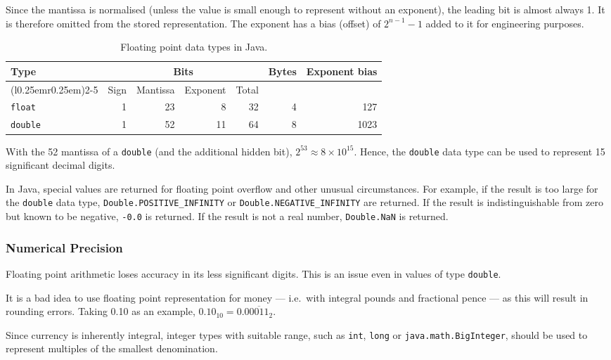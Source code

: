 Since the mantissa is normalised (unless the value is small enough to represent without an exponent), the leading bit is almost always \num{1}.
It is therefore omitted from the stored representation.
The exponent has a bias (offset) of \( 2^{n-1} - 1 \) added to it for engineering purposes.

\begin{table}[htp]
  \centering
  \caption*{Floating point data types in Java.}
  \begin{tabular}{lrrrrrr}
    \toprule
    Type & \multicolumn{4}{c}{Bits} & Bytes & Exponent bias \\
    \cmidrule(l{0.25em}r{0.25em}){2-5}
    & Sign & Mantissa & Exponent & Total & & \\
    \midrule
    \texttt{float}  & 1 & 23 &  8 & 32 & 4 &  127 \\
    \texttt{double} & 1 & 52 & 11 & 64 & 8 & 1023 \\
    \bottomrule
  \end{tabular}
\end{table}

With the \SI{52}{\bit} mantissa of a \texttt{double} (and the additional hidden bit), \( 2^{53} \approx 8 \times {10}^{15} \).
Hence, the \texttt{double} data type can be used to represent \num{15} significant decimal digits.

In Java, special values are returned for floating point overflow and other unusual circumstances.
For example, if the result is too large for the \texttt{double} data type, \texttt{Double.POSITIVE\_INFINITY} or \texttt{Double.NEGATIVE\_INFINITY} are returned.
If the result is indistinguishable from zero but known to be negative, \texttt{-0.0} is returned.
If the result is not a real number, \texttt{Double.NaN} is returned.

\subsubsection{Numerical Precision}

Floating point arithmetic loses accuracy in its less significant digits.
This is an issue even in values of type \texttt{double}.

It is a bad idea to use floating point representation for money --- i.e.\ with integral pounds and fractional pence --- as this will result in rounding errors.
Taking \SI{0.10}[\text{\textsterling}]{} as an example, \( {0.10}_{10} = {0.0\overline{0011}}_{2} \).

Since currency is inherently integral, integer types with suitable range, such as \texttt{int}, \texttt{long} or \texttt{java.math.BigInteger}, should be used to represent multiples of the smallest denomination.
